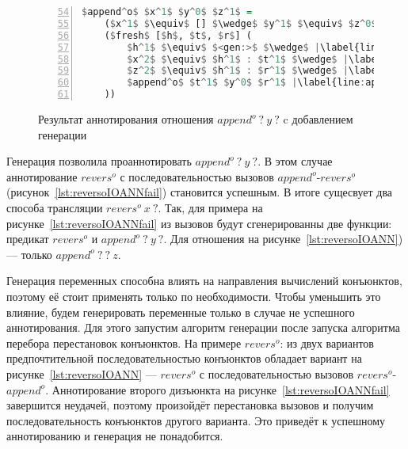 \begin{figure}[h!]
  \begin{center}
  \begin{minipage}{0.4\textwidth}
  \begin{lstlisting}[language=Haskell, frame=single, numbers=left,numberstyle=\small, firstnumber=54, escapechar=|]
  $append^o$ $x^1$ $y^0$ $z^1$ =
    ($x^1$ $\equiv$ [] $\wedge$ $y^1$ $\equiv$ $z^0$) $\vee$ |\label{line:appendoOIOANN2}|
    ($fresh$ [$h$, $t$, $r$] (
        $h^1$ $\equiv$ $<gen:>$ $\wedge$ |\label{line:appendoOIOANN4}|
        $x^2$ $\equiv$ $h^1$ : $t^1$ $\wedge$ |\label{line:appendoOIOANN5}|
        $z^2$ $\equiv$ $h^1$ : $r^1$ $\wedge$ |\label{line:appendoOIOANN6}|
        $append^o$ $t^1$ $y^0$ $r^1$ |\label{line:appendoOIOANN7}|
    ))
    \end{lstlisting}
  \end{minipage}
  \end{center}
  \caption{Результат аннотирования отношения $append^o \ ? \ y \ ?$ c добавлением генерации}
  \label{lst:appendoOIOANN}
\end{figure}

Генерация позволила проаннотировать $append^o \ ? \ y \ ?$. 
В этом случае аннотирование $revers^o$ с последовательностью вызовов $append^o$-$revers^o$ (рисунок~\ref{lst:reversoIOANNfail}) становится успешным.
В итоге сущесвует два способа трансляции $revers^o \ x \ ?$.
Так, для примера на рисунке~\ref{lst:reversoIOANNfail} из вызовов будут сгенерированны две функции: предикат $revers^o$ и $append^o \ ? \ y \ ?$.
Для отношения на рисунке~\ref{lst:reversoIOANN}) --- только $append^o \ ? \ ? \ z$.

Генерация переменных способна влиять на направления вычислений конъюнктов, поэтому её стоит применять только по необходимости.
Чтобы уменьшить это влияние, будем генерировать переменные только в случае не успешного аннотирования.
Для этого запустим алгоритм генерации после запуска алгоритма перебора перестановок конъюнктов.
На примере $revers^o$: из двух вариантов предпочтительной последовательностью конъюнктов обладает вариант на рисунке~\ref{lst:reversoIOANN} --- $revers^o$ с последовательностью вызовов $revers^o$-$append^o$.
Аннотирование второго дизъюнкта на рисунке~\ref{lst:reversoIOANNfail} завершится неудачей, поэтому произойдёт перестановка вызовов и получим последовательность конъюнктов другого варианта.
Это приведёт к успешному аннотированию и генерация не понадобится.
